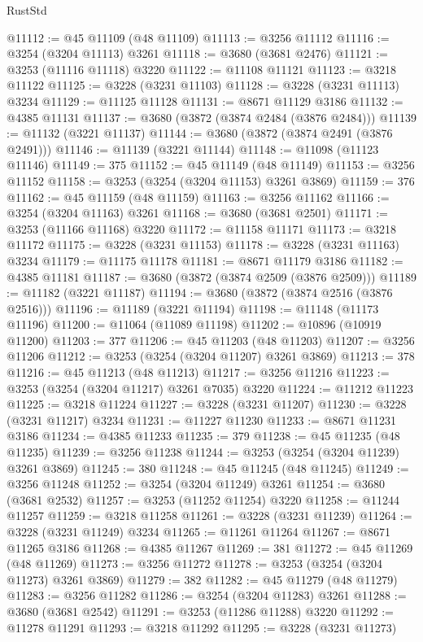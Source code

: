\begin{lexlean}{RustStd}
\begin{coremodule}
@11112 := @45 @11109 (@48 @11109)
@11113 := @3256 @11112
@11116 := @3254 (@3204 @11113) @3261
@11118 := @3680 (@3681 @2476)
@11121 := @3253 (@11116 @11118) @3220
@11122 := @11108 @11121
@11123 := @3218 @11122
@11125 := @3228 (@3231 @11103)
@11128 := @3228 (@3231 @11113) @3234
@11129 := @11125 @11128
@11131 := @8671 @11129 @3186
@11132 := @4385 @11131
@11137 := @3680 (@3872 (@3874 @2484 (@3876 @2484)))
@11139 := @11132 (@3221 @11137)
@11144 := @3680 (@3872 (@3874 @2491 (@3876 @2491)))
@11146 := @11139 (@3221 @11144)
@11148 := @11098 (@11123 @11146)
@11149 := 375
@11152 := @45 @11149 (@48 @11149)
@11153 := @3256 @11152
@11158 := @3253 (@3254 (@3204 @11153) @3261 @3869)
@11159 := 376
@11162 := @45 @11159 (@48 @11159)
@11163 := @3256 @11162
@11166 := @3254 (@3204 @11163) @3261
@11168 := @3680 (@3681 @2501)
@11171 := @3253 (@11166 @11168) @3220
@11172 := @11158 @11171
@11173 := @3218 @11172
@11175 := @3228 (@3231 @11153)
@11178 := @3228 (@3231 @11163) @3234
@11179 := @11175 @11178
@11181 := @8671 @11179 @3186
@11182 := @4385 @11181
@11187 := @3680 (@3872 (@3874 @2509 (@3876 @2509)))
@11189 := @11182 (@3221 @11187)
@11194 := @3680 (@3872 (@3874 @2516 (@3876 @2516)))
@11196 := @11189 (@3221 @11194)
@11198 := @11148 (@11173 @11196)
@11200 := @11064 (@11089 @11198)
@11202 := @10896 (@10919 @11200)
@11203 := 377
@11206 := @45 @11203 (@48 @11203)
@11207 := @3256 @11206
@11212 := @3253 (@3254 (@3204 @11207) @3261 @3869)
@11213 := 378
@11216 := @45 @11213 (@48 @11213)
@11217 := @3256 @11216
@11223 := @3253 (@3254 (@3204 @11217) @3261 @7035) @3220
@11224 := @11212 @11223
@11225 := @3218 @11224
@11227 := @3228 (@3231 @11207)
@11230 := @3228 (@3231 @11217) @3234
@11231 := @11227 @11230
@11233 := @8671 @11231 @3186
@11234 := @4385 @11233
@11235 := 379
@11238 := @45 @11235 (@48 @11235)
@11239 := @3256 @11238
@11244 := @3253 (@3254 (@3204 @11239) @3261 @3869)
@11245 := 380
@11248 := @45 @11245 (@48 @11245)
@11249 := @3256 @11248
@11252 := @3254 (@3204 @11249) @3261
@11254 := @3680 (@3681 @2532)
@11257 := @3253 (@11252 @11254) @3220
@11258 := @11244 @11257
@11259 := @3218 @11258
@11261 := @3228 (@3231 @11239)
@11264 := @3228 (@3231 @11249) @3234
@11265 := @11261 @11264
@11267 := @8671 @11265 @3186
@11268 := @4385 @11267
@11269 := 381
@11272 := @45 @11269 (@48 @11269)
@11273 := @3256 @11272
@11278 := @3253 (@3254 (@3204 @11273) @3261 @3869)
@11279 := 382
@11282 := @45 @11279 (@48 @11279)
@11283 := @3256 @11282
@11286 := @3254 (@3204 @11283) @3261
@11288 := @3680 (@3681 @2542)
@11291 := @3253 (@11286 @11288) @3220
@11292 := @11278 @11291
@11293 := @3218 @11292
@11295 := @3228 (@3231 @11273)

\end{coremodule}
\end{lexlean}
